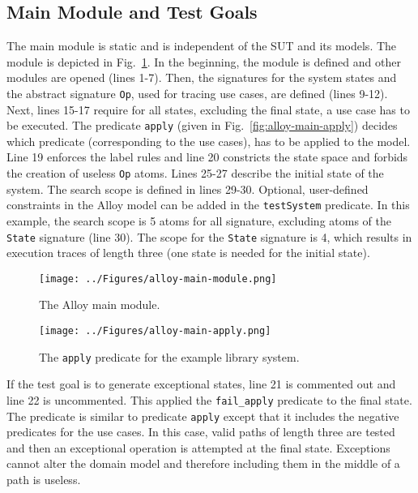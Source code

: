 \subsection{Main Module and Test Goals}
\label{sec:alloy-main-module}
The main module is static and is independent of the SUT and its models. The module is depicted in Fig.~\ref{fig:alloy-main-module}. In the beginning, the module is defined and other modules are opened (lines 1-7). Then, the signatures for the system states and the abstract signature \texttt{Op}, used for tracing use cases, are defined (lines 9-12). Next, lines 15-17 require for all states, excluding the final state, a use case has to be executed. The predicate \texttt{apply} (given in Fig.~\ref{fig:alloy-main-apply}) decides which predicate (corresponding to the use cases), has to be applied to the model. Line 19 enforces the label rules and line 20 constricts the state space and forbids the creation of useless \texttt{Op} atoms. Lines 25-27 describe the initial state of the system. The search scope is defined in lines 29-30. Optional, user-defined constraints in the Alloy model can be added in the \texttt{testSystem} predicate. In this example, the search scope is 5 atoms for all signature, excluding atoms of the \texttt{State} signature (line 30). The scope for the \texttt{State} signature is 4, which results in execution traces of length three (one state is needed for the initial state).

\begin{figure}[h]
\centering
\texttt{[image: ../Figures/alloy-main-module.png]}
\caption{The Alloy main module.}
\label{fig:alloy-main-module}
\end{figure}

\begin{figure}[h]
\centering
\texttt{[image: ../Figures/alloy-main-apply.png]}
\caption{The \texttt{apply} predicate for the example library system.}
\label{fig:lalloy-main-apply}
\end{figure}

If the test goal is to generate exceptional states, line 21 is commented out and line 22 is uncommented. This applied the \texttt{fail\_apply} predicate to the final state. The predicate is similar to predicate \texttt{apply} except that it includes the negative predicates for the use cases. In this case, valid paths of length three are tested and then an exceptional operation is attempted at the final state. Exceptions cannot alter the domain model and therefore including them in the middle of a path is useless.

